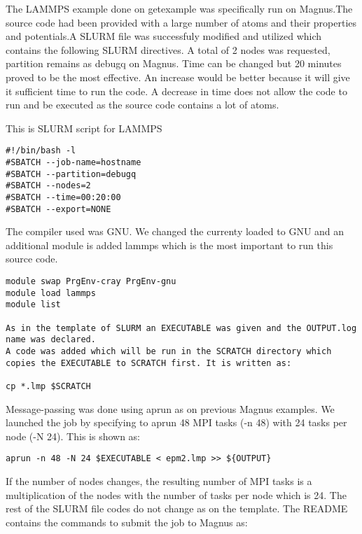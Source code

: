 \documentclass[journal]{IEEEtran}
\begin{document}
{The LAMMPS example done on getexample was specifically run on Magnus.The source code had been provided with a large number of atoms and their properties and potentials.A SLURM file was successfuly modified and utilized which contains the following SLURM directives.
A total of 2 nodes was requested, partition remains as debugq on Magnus. Time can be changed but 20 minutes proved to be the most effective. An increase would be better because it will give it sufficient time to run the code. A decrease in time does not allow the code to run and be executed as the source code contains a lot of atoms.


This is SLURM script for LAMMPS 


\begin{verbatim}
#!/bin/bash -l
#SBATCH --job-name=hostname
#SBATCH --partition=debugq
#SBATCH --nodes=2
#SBATCH --time=00:20:00
#SBATCH --export=NONE
\end{verbatim}

The compiler used was GNU. We changed the currenty loaded to GNU and an additional module is added lammps which is the most important to run this source code.

\begin{verbatim}
module swap PrgEnv-cray PrgEnv-gnu
module load lammps
module list

As in the template of SLURM an EXECUTABLE was given and the OUTPUT.log name was declared.
A code was added which will be run in the SCRATCH directory which copies the EXECUTABLE to SCRATCH first. It is written as:

cp *.lmp $SCRATCH
\end{verbatim}


Message-passing was done using aprun as on previous Magnus examples.
We launched the job by specifying to aprun 48 MPI tasks (-n 48) with 24 tasks per node (-N 24).
This is shown as:

\begin{verbatim}
aprun -n 48 -N 24 $EXECUTABLE < epm2.lmp >> ${OUTPUT}
\end{verbatim}
 
If the number of nodes changes, the resulting number of  MPI tasks is a multiplication of the nodes with the number of tasks per node which is 24.
The rest of the SLURM file codes do not change as on the template.
The README contains the commands to submit the job to Magnus as:

}
\end{document}
